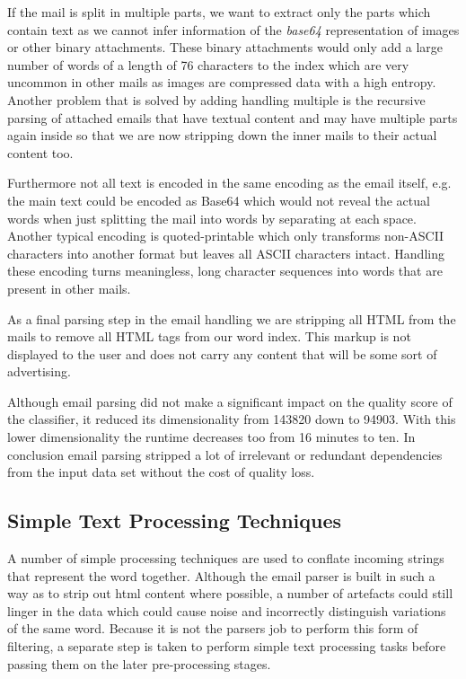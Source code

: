 If the mail is split in multiple parts, we want to extract only the parts which contain text as we cannot infer information of the \emph{base64} representation of images or other binary attachments.
These binary attachments would only add a large number of words of a length of 76 characters \cite{rfc2045} to the index which are very uncommon in other mails as images are compressed data with a high entropy.
Another problem that is solved by adding handling multiple is the recursive parsing of attached emails that have textual content and may have multiple parts again inside so that we are now stripping down the inner mails to their actual content too.

Furthermore not all text is encoded in the same encoding as the email itself, e.g. the main text could be encoded as Base64 which would not reveal the actual words when just splitting the mail into words by separating at each space.
Another typical encoding is quoted-printable which only transforms non-ASCII characters into another format but leaves all ASCII characters intact.
Handling these encoding turns meaningless, long character sequences into words that are present in other mails.

As a final parsing step in the email handling we are stripping all HTML from the mails to remove all HTML tags from our word index.
This markup is not displayed to the user and does not carry any content that will be some sort of advertising.

Although email parsing did not make a significant impact on the quality score of the classifier, it reduced its dimensionality from 143820 down to 94903.
With this lower dimensionality the runtime decreases too from 16 minutes to ten.
In conclusion email parsing stripped a lot of irrelevant or redundant dependencies from the input data set without the cost of quality loss.

\subsection{Simple Text Processing Techniques}

A number of simple processing techniques are used to conflate incoming strings that represent the word together. Although the email parser is built in such a way as to strip out html content where possible, a number of artefacts could still linger in the data which could cause noise and incorrectly distinguish variations of the same word. Because it is not the parsers job to perform this form of filtering, a separate step is taken to perform simple text processing tasks before passing them on the later pre-processing stages.

